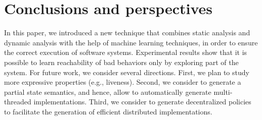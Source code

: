 \section{Conclusions and perspectives}
\label{sec:conclusion}
In this paper, we introduced a new technique that combines static analysis and dynamic analysis with the help of machine learning techniques, in order to ensure the correct execution of software systems. 
Experimental results show that it is possible to learn reachability of bad behaviors only by exploring part of the system. 
For future work, we consider several directions. 
First, we plan to study more expressive properties (e.g., liveness). Second, we consider to generate a partial state semantics, and hence, allow to automatically generate multi-threaded implementations. Third, we consider to generate decentralized policies to facilitate the generation of efficient distributed implementations. 